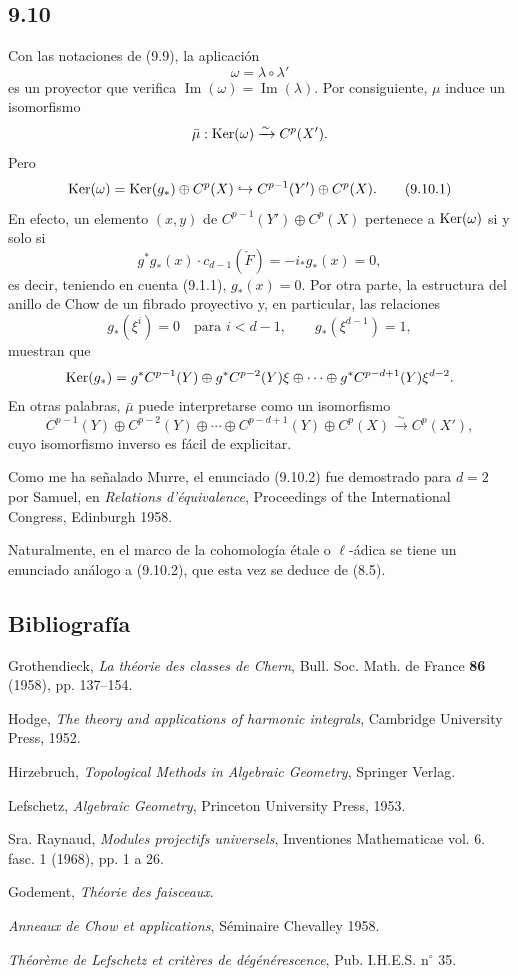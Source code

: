 \subsection*{9.10}

Con las notaciones de (9.9), la aplicación
\[
\omega=\lambda\circ\lambda'
\]
es un proyector que verifica $\operatorname{Im}(\omega)=\operatorname{Im}(\lambda)$. Por consiguiente, $\mu$ induce un isomorfismo
\[
\bar\mu:\operatorname{Ker}(\omega)\xrightarrow{\sim}C^p(X').
\]
Pero
\[
\operatorname{Ker}(\omega)=\operatorname{Ker}(g_*)\oplus C^p(X)\hookrightarrow C^{p-1}(Y')\oplus C^p(X).
\tag{9.10.1}
\]
En efecto, un elemento $(x,y)$ de $C^{p-1}(Y')\oplus C^p(X)$ pertenece a $\operatorname{Ker}(\omega)$ si y solo si
\[
g^*g_*(x)\cdot c_{d-1}(\check F)=-i_*g_*(x)=0,
\]
es decir, teniendo en cuenta (9.1.1), $g_*(x)=0$. Por otra parte, la estructura del anillo de Chow de un fibrado proyectivo y, en particular, las relaciones
\[
g_*(\xi^i)=0\quad\text{para }i<d-1,\qquad g_*(\xi^{d-1})=1,
\]
muestran que
\[
\operatorname{Ker}(g_*)=g^*C^{p-1}(Y)\oplus g^*C^{p-2}(Y)\xi\oplus\cdots\oplus g^*C^{p-d+1}(Y)\xi^{d-2}.
\]
En otras palabras, $\bar\mu$ puede interpretarse como un isomorfismo
\[
C^{p-1}(Y)\oplus C^{p-2}(Y)\oplus\cdots\oplus C^{p-d+1}(Y)\oplus C^p(X)
\xrightarrow{\sim}C^p(X'),
\tag{9.10.2}
\]
cuyo isomorfismo inverso es fácil de explicitar.

Como me ha señalado Murre, el enunciado (9.10.2) fue demostrado para $d=2$ por Samuel, en \emph{Relations d'équivalence}, Proceedings of the International Congress, Edinburgh 1958.

Naturalmente, en el marco de la cohomología étale o $\ell$-ádica se tiene un enunciado análogo a (9.10.2), que esta vez se deduce de (8.5).

\subsection*{Bibliografía}

\begin{enumerate}[label={[\arabic*]}]
\item Grothendieck, \emph{La théorie des classes de Chern}, Bull. Soc. Math. de France \textbf{86} (1958), pp. 137--154.
\item Hodge, \emph{The theory and applications of harmonic integrals}, Cambridge University Press, 1952.
\item Hirzebruch, \emph{Topological Methods in Algebraic Geometry}, Springer Verlag.
\item Lefschetz, \emph{Algebraic Geometry}, Princeton University Press, 1953.
\item Sra. Raynaud, \emph{Modules projectifs universels}, Inventiones Mathematicae vol. 6. fasc. 1 (1968), pp. 1 a 26.
\item[{[TF]}] Godement, \emph{Théorie des faisceaux}.
\item[{[CH]}] \emph{Anneaux de Chow et applications}, Séminaire Chevalley 1958.
\item[{[6]}] \emph{Théorème de Lefschetz et critères de dégénérescence}, Pub. I.H.E.S. n$^\circ$ 35.
\end{enumerate}
